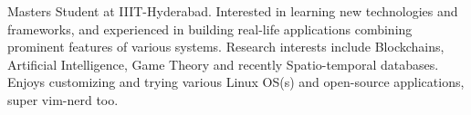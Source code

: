 


\begin{cvparagraph}

    Masters Student at IIIT-Hyderabad.
    Interested in learning new technologies and frameworks, and experienced in building real-life applications combining prominent features of various systems.
    Research interests include Blockchains, Artificial Intelligence, Game Theory and recently Spatio-temporal databases.
    Enjoys customizing and trying various Linux OS(s) and open-source applications, super vim-nerd too.
\end{cvparagraph}
